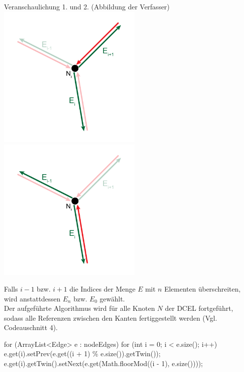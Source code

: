 \begin{Bild}{Veranschaulichung 1. und 2. (Abbildung der Verfasser)}
	\includegraphics[width = 70mm]{Bilder/Beziehung1Kanten}
	\includegraphics[width = 70mm]{Bilder/Beziehung2Kanten}
\end{Bild}

Falls $i-1$ bzw. $i+1$ die Indices der Menge $E$ mit $n$ Elementen überschreiten, wird anstattdessen $E_n$ bzw. $E_0$ gewählt. \\
Der aufgeführte Algorithmus wird für alle Knoten $N$ der DCEL fortgeführt, sodass alle Referenzen zwischen den Kanten fertiggestellt werden (Vgl. Codeauschnitt 4).  \\%

\begin{code}
	for (ArrayList<Edge> e : nodeEdges) {
		for (int i = 0; i < e.size(); i++) {
			e.get(i).setPrev(e.get((i + 1) \% e.size()).getTwin());
			e.get(i).getTwin().setNext(e.get(Math.floorMod((i - 1), e.size())));
		}
	}
\end{code}

